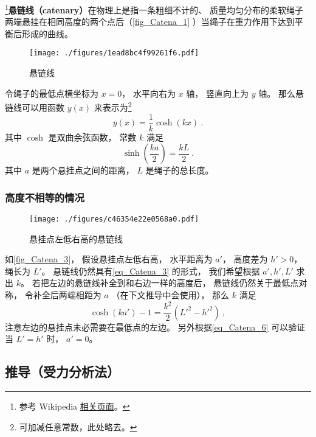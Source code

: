 

\footnote{参考 Wikipedia \href{https://en.wikipedia.org/wiki/Catenary}{相关页面}。}\textbf{悬链线（catenary）}在物理上是指一条粗细不计的、 质量均匀分布的柔软绳子两端悬挂在相同高度的两个点后（\autoref{fig_Catena_1} ）当绳子在重力作用下达到平衡后形成的曲线。

\begin{figure}[ht]
\centering
\texttt{[image: ./figures/1ead8bc4f99261f6.pdf]}
\caption{悬链线} \label{fig_Catena_1}
\end{figure}

令绳子的最低点横坐标为 $x = 0$， 水平向右为 $x$ 轴， 竖直向上为 $y$ 轴。 那么悬链线可以用函数 $y(x)$ 来表示为\footnote{可加减任意常数，此处略去。}
\begin{equation}\label{eq_Catena_3}
y(x) = \frac{1}{k}\cosh(kx)~.
\end{equation}
其中 $\cosh$ 是双曲余弦函数， 常数 $k$ 满足
\begin{equation}\label{eq_Catena_10}
\sinh(\frac{ka}{2}) = \frac{kL}{2}~.
\end{equation}
其中 $a$ 是两个悬挂点之间的距离， $L$ 是绳子的总长度。

\subsubsection{高度不相等的情况}
\begin{figure}[ht]
\centering
\texttt{[image: ./figures/c46354e22e0568a0.pdf]}
\caption{悬挂点左低右高的悬链线} \label{fig_Catena_3}
\end{figure}
如\autoref{fig_Catena_3}， 假设悬挂点左低右高， 水平距离为 $a'$， 高度差为 $h' > 0$， 绳长为 $L'$。 悬链线仍然具有\autoref{eq_Catena_3} 的形式， 我们希望根据 $a', h', L'$ 求出 $k$。 若把左边的悬链线补全到和右边一样的高度后， 悬链线仍然关于最低点对称， 令补全后两端相距为 $a$ （在下文推导中会使用）， 那么 $k$ 满足
\begin{equation}\label{eq_Catena_6}
\cosh(ka') - 1 = \frac{k^2}{2}(L'^2 - h'^2)~,
\end{equation}
注意左边的悬挂点未必需要在最低点的左边。 另外根据\autoref{eq_Catena_6} 可以验证当 $L' = h'$ 时， $a' = 0$。

\subsection{推导（受力分析法）}

